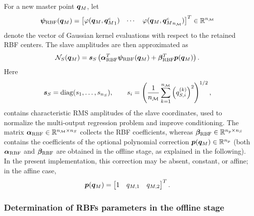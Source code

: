 \documentclass[11pt,a4paper]{article}
\begin{document}
For a new master point $\bm{q}_M$, let
\[
    \bm{\psi}_{\mathrm{RBF}}(\bm{q}_M)
    =
    \begin{bmatrix}
    \varphi(\bm{q}_M,{\bm{q}_M^{c}}_1) &
    \cdots &
    \varphi(\bm{q}_M,{\bm{q}_M^{c}}_{n_{\mathcal{M}}})
    \end{bmatrix}^T
    \in
    \mathbb{R}^{n_{\mathcal{M}}}
\]
denote the vector of Gaussian kernel evaluations with respect to the retained
RBF centers. The slave amplitudes are then approximated as
\begin{equation}
\label{eq:RBF_slave_map}
    \mathcal{N}_{S}(\bm{q}_M)
    =
    \bm{s}_{S}
    \left(
    \bm{\alpha}_{\mathrm{RBF}}^T\bm{\psi}_{\mathrm{RBF}}(\bm{q}_M)
    +
    \bm{\beta}_{\mathrm{RBF}}^T\bm{p}(\bm{q}_M)
    \right).
\end{equation}
Here
\[
    \bm{s}_{S}=\operatorname{diag}(s_1,\ldots,s_{n_{S}}),
    \qquad
    s_i=
    \left(
    \frac{1}{n_{\mathcal{M}}}
    \sum_{k=1}^{n_{\mathcal{M}}}
    \left(q^{(k)}_{S,i}\right)^2
    \right)^{1/2},
\]
contains characteristic RMS amplitudes of the slave coordinates, used to
normalize the multi-output regression problem and improve conditioning. The
matrix $\bm{\alpha}_{\mathrm{RBF}}\in\mathbb{R}^{n_{\mathcal{M}}\times n_{S}}$ collects the RBF coefficients,
whereas $\bm{\beta}_{\mathrm{RBF}}\in\mathbb{R}^{n_p\times n_{S}}$ contains the coefficients of
the optional polynomial correction $\bm{p}(\bm{q}_M)\in\mathbb{R}^{n_p}$  (both $\bm{\alpha}_{\mathrm{RBF}}$ and $\bm{\beta}_{\mathrm{RBF}}$ are obtained in the offline stage, as explained in the following). In the
present implementation, this correction may be absent, constant, or affine; in
the affine case,
\[
    \bm{p}(\bm{q}_M)
    =
    \begin{bmatrix}
    1 & q_{M,1} & q_{M,2}
    \end{bmatrix}^T .
\]

\subsubsection{Determination of RBFs parameters in the offline stage}
\end{document}
